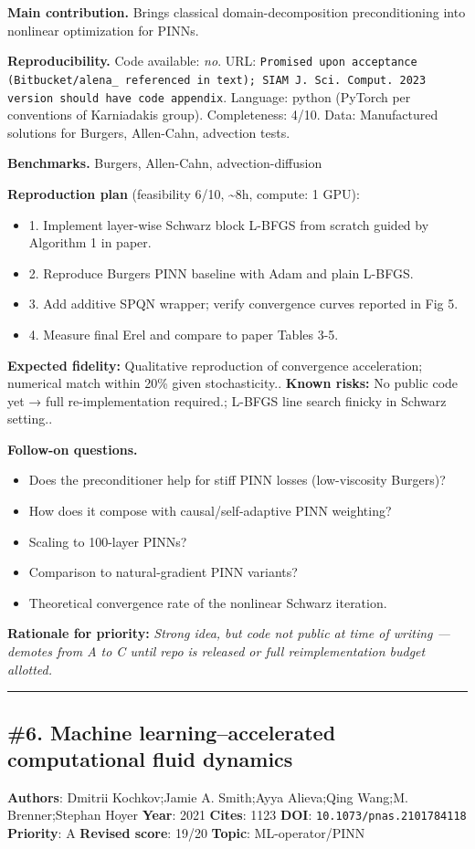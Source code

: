 \documentclass[10pt,letterpaper]{article}
\begin{document}
\textbf{Main contribution.} Brings classical domain-decomposition preconditioning into nonlinear optimization for PINNs.

\textbf{Reproducibility.} Code available: \emph{no}. URL: \texttt{Promised upon acceptance (Bitbucket/alena\_ referenced in text); SIAM J. Sci. Comput. 2023 version should have code appendix}. Language: python (PyTorch per conventions of Karniadakis group). Completeness: 4/10. Data: Manufactured solutions for Burgers, Allen-Cahn, advection tests.

\textbf{Benchmarks.} Burgers, Allen-Cahn, advection-diffusion

\textbf{Reproduction plan} (feasibility 6/10, \textasciitilde8h, compute: 1 GPU):
\begin{itemize}
\item 1. Implement layer-wise Schwarz block L-BFGS from scratch guided by Algorithm 1 in paper.
\item 2. Reproduce Burgers PINN baseline with Adam and plain L-BFGS.
\item 3. Add additive SPQN wrapper; verify convergence curves reported in Fig 5.
\item 4. Measure final Erel and compare to paper Tables 3-5.
\end{itemize}
\textbf{Expected fidelity:} Qualitative reproduction of convergence acceleration; numerical match within 20\% given stochasticity.. \textbf{Known risks:} No public code yet → full re-implementation required.; L-BFGS line search finicky in Schwarz setting..

\textbf{Follow-on questions.}
\begin{itemize}
\item Does the preconditioner help for stiff PINN losses (low-viscosity Burgers)?
\item How does it compose with causal/self-adaptive PINN weighting?
\item Scaling to 100-layer PINNs?
\item Comparison to natural-gradient PINN variants?
\item Theoretical convergence rate of the nonlinear Schwarz iteration.
\end{itemize}

\textbf{Rationale for priority:} \emph{Strong idea, but code not public at time of writing — demotes from A to C until repo is released or full reimplementation budget allotted.}

\medskip\hrule\medskip

\subsection*{\#6. Machine learning–accelerated computational fluid dynamics}
\textbf{Authors}: Dmitrii Kochkov;Jamie A. Smith;Ayya Alieva;Qing Wang;M. Brenner;Stephan Hoyer \textbullet{} \textbf{Year}: 2021 \textbullet{} \textbf{Cites}: 1123 \textbullet{} \textbf{DOI}: \texttt{10.1073/pnas.2101784118} \\
\textbf{Priority}: A \textbullet{} \textbf{Revised score}: 19/20 \textbullet{} \textbf{Topic}: ML-operator/PINN
\end{document}
